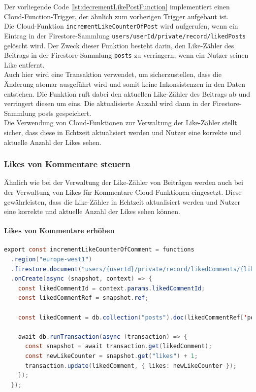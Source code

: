 Der vorliegende Code \ref{lst:decrementLikePostFunction} implementiert einen Cloud-Function-Trigger, der ähnlich zum vorherigen Trigger aufgebaut ist.
\\
Die Cloud-Funktion \texttt{incrementLikeCounterOfPost} wird aufgerufen, wenn ein Eintrag in der Firestore-Sammlung \texttt{users/{userId}/private/record/likedPosts} gelöscht wird. Der Zweck dieser Funktion besteht darin, den Like-Zähler des Beitrags in der Firestore-Sammlung \texttt{posts} zu verringern, wenn ein Nutzer seinen Like entfernt.
\\
Auch hier wird eine Transaktion verwendet, um sicherzustellen, dass die Änderung atomar ausgeführt wird und somit keine Inkonsistenzen in den Daten entstehen. Die Funktion ruft dabei den aktuellen Like-Zähler des Beitrags ab und verringert diesen um eins. Die aktualisierte Anzahl wird dann in der Firestore-Sammlung posts gespeichert.
\\
Die Verwendung von Cloud-Funktionen zur Verwaltung der Like-Zähler stellt sicher, dass diese in Echtzeit aktualisiert werden und Nutzer eine korrekte und aktuelle Anzahl der Likes sehen.

\subsubsection{Likes von Kommentare steuern}

Ähnlich wie bei der Verwaltung der Like-Zähler von Beiträgen werden auch bei der Verwaltung von Likes für Kommentare Cloud-Funktionen eingesetzt. Diese gewährleisten, dass die Like-Zähler in Echtzeit aktualisiert werden und Nutzer eine korrekte und aktuelle Anzahl der Likes sehen können.

\paragraph{Likes von Kommentare erhöhen}

\begin{lstlisting}[language=Java,caption=incrementLikeCounterOfComment Funktion,label=lst:incrementLikeCommentFunction]
  export const incrementLikeCounterOfComment = functions
  .region("europe-west1")
  .firestore.document("users/{userId}/private/record/likedComments/{likedCommentId}")
  .onCreate(async (snapshot, context) => {
    const likedCommentId = context.params.likedCommentId;
    const likedCommentRef = snapshot.ref;

    const likedComment = db.collection("posts").doc(likedCommentRef['post']).collection('comments').doc(likedCommentId);

    await db.runTransaction(async (transaction) => {
      const snapshot = await transaction.get(likedComment);
      const newLikeCounter = snapshot.get("likes") + 1;
      transaction.update(likedComment, { likes: newLikeCounter });
    });
  });
\end{lstlisting}

